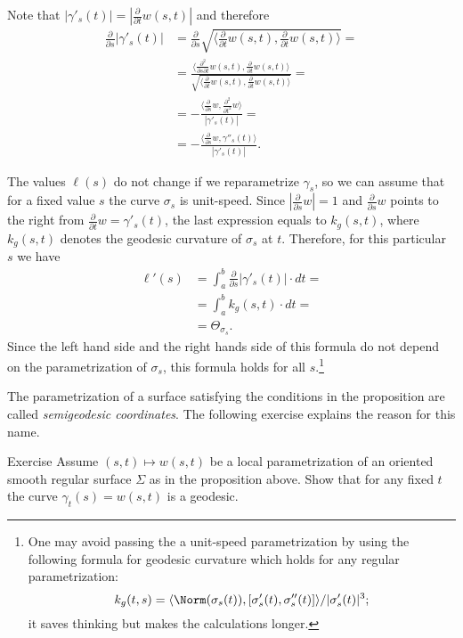 Note that $|\gamma'_s(t)|=|\tfrac{\partial}{\partial t}w(s,t)|$ and therefore
\begin{align*}
\tfrac \partial {\partial s}|\gamma'_s(t)|&=\tfrac \partial {\partial s}\sqrt{\langle \tfrac{\partial}{\partial t}w(s,t),\tfrac{\partial}{\partial t}w(s,t)\rangle}=
\\
&=\frac{\langle \tfrac{\partial^2}{\partial s\partial t}w(s,t),\tfrac{\partial}{\partial t}w(s,t)\rangle}{\sqrt{\langle \tfrac{\partial}{\partial t}w(s,t),\tfrac{\partial}{\partial t}w(s,t)\rangle}}=
\\
&=-\frac{\langle\tfrac{\partial}{\partial s}w, \tfrac{\partial^2}{\partial t^2}w\rangle}{|\gamma'_s(t)|}=
\\
&=-\frac{\langle\tfrac{\partial}{\partial s}w, \gamma''_s(t)\rangle}{|\gamma'_s(t)|}.
\end{align*}

The values $\ell(s)$ do not change if we reparametrize $\gamma_s$,
so we can assume that for a fixed value $s$ the curve $\sigma_s$ is unit-speed.
Since $|\tfrac{\partial}{\partial s}w|=1$ and $\tfrac{\partial}{\partial s}w$ points to the right from $\tfrac{\partial}{\partial t}w=\gamma'_s(t)$, the last expression equals to $k_g(s,t)$,
where $k_g(s,t)$ denotes the geodesic curvature of $\sigma_s$ at $t$. 
Therefore, for this particular $s$ we have
\begin{align*}
\ell'(s)&= \int_a^b \tfrac \partial {\partial s} |\gamma'_s(t)|\cdot dt =
\\
&= \int_a^b k_g(s,t)\cdot dt=
\\
&=\Theta_{\sigma_s}.
\end{align*}
Since the left hand side and the right hands side of this formula do not depend on the parametrization of $\sigma_s$, this formula holds for all $s$.\footnote{One may avoid passing the a unit-speed parametrization by using the following formula for geodesic curvature which holds for any regular parametrization: 
\[k_g(t,s)=\langle \Norm(\sigma_s(t)),[\sigma'_s(t),\sigma''_s(t)]\rangle/|\sigma_s'(t)|^3;\]
it saves thinking but makes the calculations longer.}
\qeds

The parametrization of a surface satisfying the conditions in the proposition are called \emph{semigeodesic coordinates}.
The following exercise explains the reason for this name.

\begin{thm}{Exercise}\label{ex:geod-semigeod}
Assume $(s,t)\mapsto w(s,t)$ be a local parametrization of an oriented smooth regular surface $\Sigma$ as in the proposition above.
Show that for any fixed $t$ the curve $\gamma_t(s)= w(s,t)$ is a geodesic.
\end{thm}







